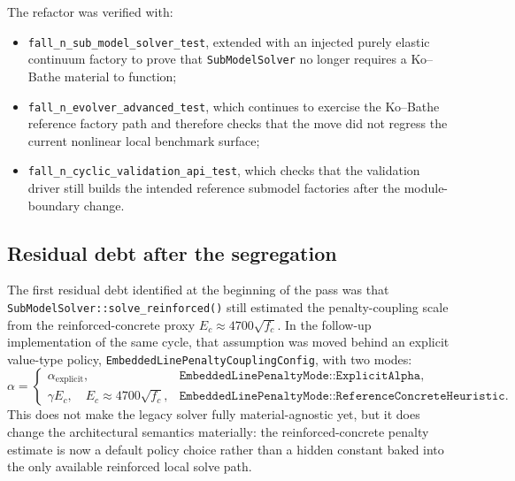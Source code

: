 The refactor was verified with:
\begin{itemize}
  \item \texttt{fall\_n\_sub\_model\_solver\_test}, extended with an injected
    purely elastic continuum factory to prove that \texttt{SubModelSolver}
    no longer requires a Ko--Bathe material to function;
  \item \texttt{fall\_n\_evolver\_advanced\_test}, which continues to exercise
    the Ko--Bathe reference factory path and therefore checks that the move did
    not regress the current nonlinear local benchmark surface;
  \item \texttt{fall\_n\_cyclic\_validation\_api\_test}, which checks that the
    validation driver still builds the intended reference submodel factories
    after the module-boundary change.
\end{itemize}

\subsection{Residual debt after the segregation}

The first residual debt identified at the beginning of the pass was that
\texttt{SubModelSolver::solve\_reinforced()} still estimated the penalty-coupling
scale from the reinforced-concrete proxy
\(E_c \approx 4700\sqrt{f_c}\).  In the follow-up implementation of the same
cycle, that assumption was moved behind an explicit value-type policy,
\texttt{EmbeddedLinePenaltyCouplingConfig}, with two modes:
\begin{equation}
  \alpha =
  \begin{cases}
    \alpha_{\mathrm{explicit}}, &
    \texttt{EmbeddedLinePenaltyMode::ExplicitAlpha},\\[4pt]
    \gamma E_c, \quad E_c \approx 4700\sqrt{f_c}, &
    \texttt{EmbeddedLinePenaltyMode::ReferenceConcreteHeuristic}.
  \end{cases}
  \label{eq:ms-stab-embedded-line-penalty-policy}
\end{equation}
This does not make the legacy solver fully material-agnostic yet, but it does
change the architectural semantics materially: the reinforced-concrete penalty
estimate is now a default policy choice rather than a hidden constant baked
into the only available reinforced local solve path.

